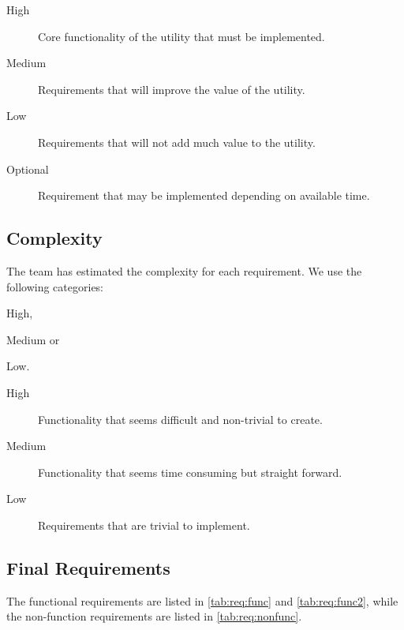 \begin{description}
	\item[High] Core functionality of the \gls{utility} that must be implemented.
	\item[Medium] Requirements that will improve the value of the \gls{utility}.
	\item[Low] Requirements that will not add much value to the \gls{utility}.
	\item[Optional] Requirement that may be implemented depending on available time.
\end{description}

\subsection{Complexity}
\label{sec:req:compl}
The team has estimated the complexity for each requirement. We use the following categories:
\begin{inparaenum}
	\item High,
	\item Medium or
	\item Low.
\end{inparaenum}

\begin{description}
	\item[High] Functionality that seems difficult and non-trivial to create.
	\item[Medium] Functionality that seems time consuming but straight forward.
	\item[Low] Requirements that are trivial to implement.
\end{description}

\subsection{Final Requirements}
\label{sec:req:finalreq}
The functional requirements are listed in \autoref{tab:req:func} and 
\autoref{tab:req:func2}, while the non-function requirements are listed in
\autoref{tab:req:nonfunc}.

